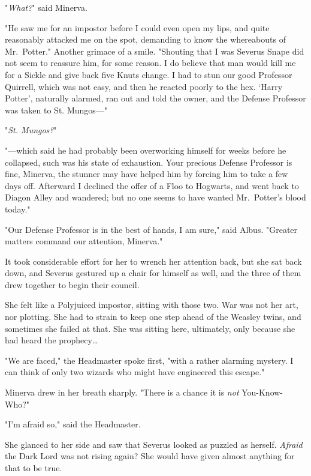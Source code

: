 "\emph{What?}" said Minerva.

"He saw me for an impostor before I could even open my lips, and quite 
reasonably attacked me on the spot, demanding to know the whereabouts of 
Mr.~Potter." Another grimace of a smile. "Shouting that I was Severus Snape did 
not seem to reassure him, for some reason. I do believe that man would kill me 
for a Sickle and give back five Knuts change. I had to stun our good Professor 
Quirrell, which was not easy, and then he reacted poorly to the hex. `Harry 
Potter', naturally alarmed, ran out and told the owner, and the Defense 
Professor was taken to St. Mungos---"

"\emph{St. Mungos?}"

"---which said he had probably been overworking himself for weeks before he 
collapsed, such was his state of exhaustion. Your precious Defense Professor is 
fine, Minerva, the stunner may have helped him by forcing him to take a few 
days off. Afterward I declined the offer of a Floo to Hogwarts, and went back 
to Diagon Alley and wandered; but no one seems to have wanted Mr.~Potter's 
blood today."

"Our Defense Professor is in the best of hands, I am sure," said Albus. 
"Greater matters command our attention, Minerva."

It took considerable effort for her to wrench her attention back, but she sat 
back down, and Severus gestured up a chair for himself as well, and the three 
of them drew together to begin their council.

She felt like a Polyjuiced impostor, sitting with those two. War was not her 
art, nor plotting. She had to strain to keep one step ahead of the Weasley 
twins, and sometimes she failed at that. She was sitting here, ultimately, only 
because she had heard the prophecy{\ldots}

"We are faced," the Headmaster spoke first, "with a rather alarming mystery. I 
can think of only two wizards who might have engineered this escape."

Minerva drew in her breath sharply. "There is a chance it is \emph{not} 
You-Know-Who?"

"I'm afraid so," said the Headmaster.

She glanced to her side and saw that Severus looked as puzzled as herself. 
\emph{Afraid} the Dark Lord was not rising again? She would have given almost 
anything for that to be true.

